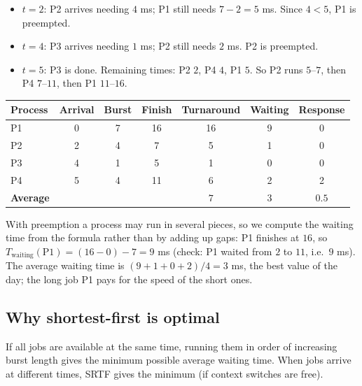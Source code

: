 \documentclass[11pt,a4paper]{article}
\begin{document}
\begin{center}
\end{center}

\begin{itemize}
  \item $t=2$: P2 arrives needing $4$ ms; P1 still needs $7-2=5$ ms. Since $4<5$, P1 is preempted.
  \item $t=4$: P3 arrives needing $1$ ms; P2 still needs $2$ ms. P2 is preempted.
  \item $t=5$: P3 is done. Remaining times: P2 $2$, P4 $4$, P1 $5$. So P2 runs $5$--$7$, then P4 $7$--$11$, then P1 $11$--$16$.
\end{itemize}

\begin{center}
\renewcommand{\arraystretch}{1.2}
\begin{tabular}{@{}lcccccc@{}}
\toprule
\textbf{Process} & \textbf{Arrival} & \textbf{Burst} & \textbf{Finish} & \textbf{Turnaround} & \textbf{Waiting} & \textbf{Response}\\
\midrule
P1 & 0 & 7 & 16 & 16 & 9 & 0\\
P2 & 2 & 4 & 7 & 5 & 1 & 0\\
P3 & 4 & 1 & 5 & 1 & 0 & 0\\
P4 & 5 & 4 & 11 & 6 & 2 & 2\\
\midrule
\textbf{Average} & & & & $7$ & $3$ & $0.5$\\
\bottomrule
\end{tabular}
\end{center}

With preemption a process may run in several pieces, so we compute the waiting time from the formula rather than by adding up gaps: P1 finishes at $16$, so $T_{\text{waiting}}(\text{P1}) = (16-0) - 7 = 9$ ms (check: P1 waited from $2$ to $11$, i.e.\ $9$ ms). The average waiting time is $(9+1+0+2)/4 = 3$ ms, the best value of the day; the long job P1 pays for the speed of the short ones.

\subsection{Why shortest-first is optimal}

\begin{keyidea}
If all jobs are available at the same time, running them in order of increasing burst length gives the minimum possible average waiting time. When jobs arrive at different times, SRTF gives the minimum (if context switches are free).
\end{keyidea}
\end{document}
